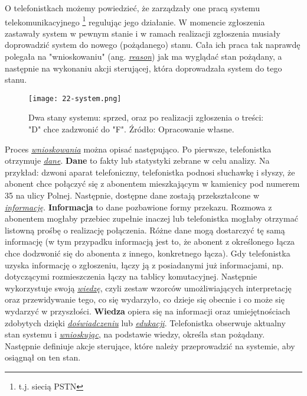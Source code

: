 O telefonistkach możemy powiedzieć, że zarządzały one pracą systemu telekomunikacyjnego \footnote{t.j. siecią PSTN} regulując jego działanie. W momencie zgłoszenia zastawały system w pewnym stanie i w ramach realizacji zgłoszenia musiały doprowadzić system do nowego (pożądanego) stanu. Cała ich praca tak naprawdę polegała na "wnioskowaniu" (ang. \hyperlink{def:wnioskowanie}{\textit{reason}}) jak ma wyglądać stan pożądany, a następnie na wykonaniu akcji sterującej, która doprowadzała system do tego stanu. 

\begin{figure}[!htbp]
    \centering \texttt{[image: 22-system.png]}
    \caption{Dwa stany systemu: sprzed, oraz po realizacji zgłoszenia o treści: "D" chce zadzwonić do "F". Źródło: Opracowanie własne.}
\end{figure}

Proces \hyperlink{def:wnioskowanie}{\textit{wnioskowania}} można opisać następująco. Po pierwsze, telefonistka otrzymuje \hyperlink{def:dane}{\textit{dane}}. \textbf{Dane} to fakty lub statystyki zebrane w celu analizy. Na przykład: dzwoni aparat telefoniczny, telefonistka podnosi słuchawkę i słyszy, że abonent chce połączyć się z abonentem mieszkającym w kamienicy pod numerem 35 na ulicy Polnej. Następnie, dostępne dane zostają przekształcone w \hyperlink{def:informacja}{\textit{informację}}. \textbf{Informacja} to dane pozbawione formy przekazu. Rozmowa z abonentem mogłaby przebiec zupełnie inaczej lub telefonistka mogłaby otrzymać listowną prośbę o realizację połączenia. Różne dane mogą dostarczyć tę samą informację (w tym przypadku informacją jest to, że  abonent z określonego łącza chce dodzwonić się do abonenta z innego, konkretnego łącza). Gdy telefonistka uzyska informację o zgłoszeniu, łączy ją z posiadanymi już informacjami, np. dotyczącymi rozmieszczenia łączy na tablicy komutacyjnej. Następnie wykorzystuje swoją \hyperlink{def:wiedza}{\textit{wiedzę}}, czyli zestaw wzorców umożliwiających interpretację oraz przewidywanie tego, co się wydarzyło, co dzieje się obecnie i co może się wydarzyć w przyszłości. \textbf{Wiedza} opiera się na informacji oraz umiejętnościach zdobytych dzięki \hyperlink{def:doswiadczenie}{\textit{doświadczeniu}} lub \hyperlink{def:edukacja}{\textit{edukacji}}. Telefonistka obserwuje aktualny stan systemu i \hyperlink{def:wnioskowanie}{\textit{wnioskując}}, na podstawie wiedzy, określa stan pożądany. Następnie definiuje akcje sterujące, które należy przeprowadzić na systemie, aby osiągnął on ten stan.


